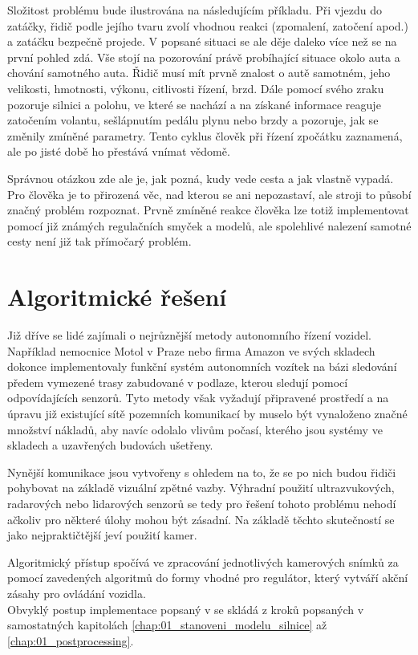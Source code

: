 \documentclass[czech, bc, kky, he, iso690alph]{fasthesis}
\begin{document}
        Složitost problému bude ilustrována na následujícím příkladu. Při vjezdu do zatáčky, řidič podle jejího tvaru zvolí vhodnou reakci (zpomalení, zatočení apod.) a zatáčku bezpečně projede. V popsané situaci se ale děje daleko více než se na první pohled zdá. Vše stojí na pozorování právě probíhající situace okolo auta a chování samotného auta. Řidič musí mít prvně znalost o autě samotném, jeho velikosti, hmotnosti, výkonu, citlivosti řízení, brzd. Dále pomocí svého zraku pozoruje silnici a polohu, ve které se nachází a na získané informace reaguje zatočením volantu, sešlápnutím pedálu plynu nebo brzdy a pozoruje, jak se změnily zmíněné parametry. Tento cyklus člověk při řízení zpočátku zaznamená, ale po jisté době ho přestává vnímat vědomě.
        
        Správnou otázkou zde ale je, jak pozná, kudy vede cesta a jak vlastně vypadá. Pro člověka je to přirozená věc, nad kterou se ani nepozastaví, ale stroji to působí značný problém rozpoznat. Prvně zmíněné reakce člověka lze totiž implementovat pomocí již známých regulačních smyček a modelů, ale spolehlivé nalezení samotné cesty není již tak přímočarý problém.
        
        \section{Algoritmické řešení}
            Již dříve se lidé zajímali o nejrůznější metody autonomního řízení vozidel. Například nemocnice Motol v Praze nebo firma Amazon ve svých skladech dokonce implementovaly funkční systém autonomních vozítek na bázi sledování předem vymezené trasy zabudované v podlaze, kterou sledují pomocí odpovídajících senzorů. Tyto metody však vyžadují připravené prostředí a na úpravu již existující sítě pozemních komunikací by muselo být vynaloženo značné množství nákladů, aby navíc odolalo vlivům počasí, kterého jsou systémy ve skladech a uzavřených budovách ušetřeny.
            
            Nynější komunikace jsou vytvořeny s ohledem na to, že se po nich budou řidiči pohybovat na základě vizuální zpětné vazby. Výhradní použití ultrazvukových, radarových nebo lidarových senzorů se tedy pro řešení tohoto problému nehodí ačkoliv pro některé úlohy mohou být zásadní. Na základě těchto skutečností se jako nejpraktičtější jeví použití kamer.
            
            Algoritmický přístup spočívá ve zpracování jednotlivých kamerových snímků za pomocí zavedených algoritmů do formy vhodné pro regulátor, který vytváří akční zásahy pro ovládání vozidla.\\
            Obvyklý postup implementace popsaný v \cite{VIOLET} se skládá z kroků popsaných v samostatných kapitolách \ref{chap:01_stanoveni_modelu_silnice} až \ref{chap:01_postprocessing}.\\
\end{document}
